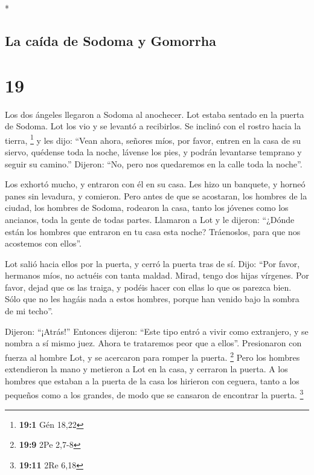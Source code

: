 \begin{paracol}{2}
\begin{otherlanguage}{english}
\end{otherlanguage}

\switchcolumn[0]*

\hypertarget{la-cauxedda-de-sodoma-y-gomorrha}{%
\subsection{La caída de Sodoma y
Gomorrha}\label{la-cauxedda-de-sodoma-y-gomorrha}}

\hypertarget{section-36}{%
\section{19}\label{section-36}}

 Los dos ángeles llegaron a Sodoma al anochecer. Lot
estaba sentado en la puerta de Sodoma. Lot los vio y se levantó a
recibirlos. Se inclinó con el rostro hacia la tierra, \footnote{\textbf{19:1}
  Gén 18,22}  y les dijo: ``Vean ahora, señores míos, por
favor, entren en la casa de su siervo, quédense toda la noche, lávense
los pies, y podrán levantarse temprano y seguir su camino.'' Dijeron:
``No, pero nos quedaremos en la calle toda la noche''.

 Los exhortó mucho, y entraron con él en su casa. Les hizo
un banquete, y horneó panes sin levadura, y comieron. 
Pero antes de que se acostaran, los hombres de la ciudad, los hombres de
Sodoma, rodearon la casa, tanto los jóvenes como los ancianos, toda la
gente de todas partes.  Llamaron a Lot y le dijeron:
``¿Dónde están los hombres que entraron en tu casa esta noche?
Tráenoslos, para que nos acostemos con ellos''.

 Lot salió hacia ellos por la puerta, y cerró la puerta
tras de sí.  Dijo: ``Por favor, hermanos míos, no actuéis
con tanta maldad.  Mirad, tengo dos hijas vírgenes. Por
favor, dejad que os las traiga, y podéis hacer con ellas lo que os
parezca bien. Sólo que no les hagáis nada a estos hombres, porque han
venido bajo la sombra de mi techo''.

 Dijeron: ``¡Atrás!'' Entonces dijeron: ``Este tipo entró
a vivir como extranjero, y se nombra a sí mismo juez. Ahora te
trataremos peor que a ellos''. Presionaron con fuerza al hombre Lot, y
se acercaron para romper la puerta. \footnote{\textbf{19:9} 2Pe 2,7-8}
 Pero los hombres extendieron la mano y metieron a Lot en
la casa, y cerraron la puerta.  A los hombres que estaban
a la puerta de la casa los hirieron con ceguera, tanto a los pequeños
como a los grandes, de modo que se cansaron de encontrar la puerta.
\footnote{\textbf{19:11} 2Re 6,18}


\end{paracol}
